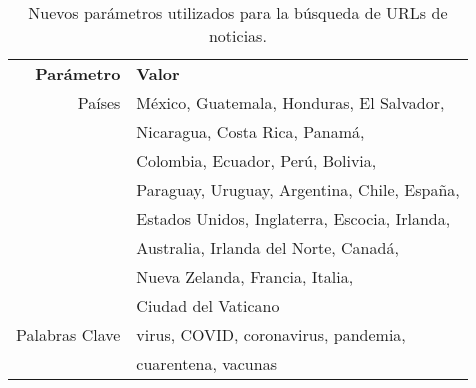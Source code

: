 \begin{table}[h]
    \centering
    \begin{tabular}{r|l}
        \textbf{Parámetro} & \textbf{Valor} \\
        Países  & México, Guatemala, Honduras, El Salvador, \\
                & Nicaragua, Costa Rica, Panamá, \\
                & Colombia, Ecuador, Perú, Bolivia, \\
                & Paraguay, Uruguay, Argentina, Chile, España, \\
                & Estados Unidos, Inglaterra, Escocia, Irlanda, \\
                & Australia, Irlanda del Norte, Canadá, \\
                & Nueva Zelanda, Francia, Italia, \\
                & Ciudad del Vaticano \\
        Palabras Clave & virus, COVID, coronavirus, pandemia, \\
                & cuarentena, vacunas \\
    \end{tabular}
    \caption{Nuevos parámetros utilizados para la búsqueda de URLs de noticias.}
    \label{tab:news_final_parameters}
\end{table}